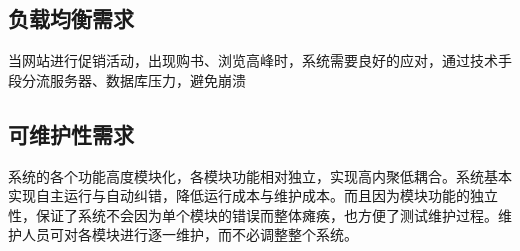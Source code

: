 \subsection{负载均衡需求}
当网站进行促销活动，出现购书、浏览高峰时，系统需要良好的应对，通过技术手段分流服务器、数据库压力，避免崩溃
\subsection{可维护性需求}
系统的各个功能高度模块化，各模块功能相对独立，实现高内聚低耦合。系统基本实现自主运行与自动纠错，降低运行成本与维护成本。而且因为模块功能的独立性，保证了系统不会因为单个模块的错误而整体瘫痪，也方便了测试维护过程。维护人员可对各模块进行逐一维护，而不必调整整个系统。